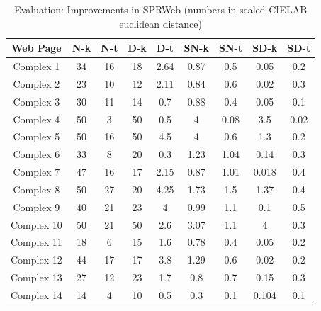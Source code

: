 \begin{table}[!htb]
\caption{Evaluation: Improvements in SPRWeb (numbers in scaled CIELAB euclidean distance)}
\centering
\begin{tabular}{c c c c c c c c c}
\hline\hline
Web Page & N-k & N-t & D-k & D-t & SN-k & SN-t & SD-k & SD-t\\ [0.5ex]
\hline
Complex 1 & 34 & 16 & 18 & 2.64 & 0.87 & 0.5 & 0.05 & 0.2 \\
Complex 2 & 23 & 10 & 12 & 2.11 & 0.84 & 0.6 & 0.02 & 0.3\\
Complex 3 & 30 & 11 & 14 & 0.7 & 0.88 & 0.4 & 0.05 & 0.1\\
Complex 4 & 50 & 3 & 50 & 0.5 & 4 & 0.08 & 3.5 & 0.02\\
Complex 5 & 50 & 16 & 50 & 4.5 & 4 & 0.6 &1.3 & 0.2\\
Complex 6 & 33 & 8 & 20 & 0.3 & 1.23 & 1.04 & 0.14 & 0.3\\
Complex 7 & 47 & 16 & 17 & 2.15 & 0.87 & 1.01 & 0.018 & 0.4\\
Complex 8 & 50 & 27 & 20 & 4.25 & 1.73 & 1.5 & 1.37 & 0.4\\
Complex 9 & 40 & 21 & 23 & 4 & 0.99 & 1.1 & 0.1 & 0.5\\
Complex 10 & 50 & 21 & 50 & 2.6 & 3.07 & 1.1 & 4 & 0.3\\
Complex 11 & 18 & 6 & 15 & 1.6 & 0.78 & 0.4 & 0.05 & 0.2\\
Complex 12 & 44 & 17 & 17 & 3.8 & 1.29 & 0.6 & 0.02 & 0.2\\
Complex 13 & 27 & 12 & 23 & 1.7 & 0.8 & 0.7 & 0.15 & 0.3\\
Complex 14 & 14 & 4 & 10 & 0.5 & 0.3 & 0.1 & 0.104 & 0.1\\ [1ex]
\hline
\end{tabular}
\label{table:nonlin}
\end{table}

